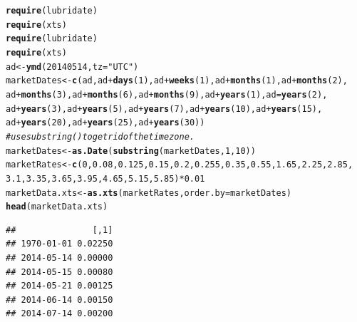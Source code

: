 \documentclass[12pt, a4paper, oneside]{article}\usepackage[]{graphicx}\usepackage[]{color}
\makeatletter
\newcommand{\hlnum}[1]{\textcolor[rgb]{0.686,0.059,0.569}{#1}}%
\newcommand{\hlstr}[1]{\textcolor[rgb]{0.192,0.494,0.8}{#1}}%
\newcommand{\hlcom}[1]{\textcolor[rgb]{0.678,0.584,0.686}{\textit{#1}}}%
\newcommand{\hlopt}[1]{\textcolor[rgb]{0,0,0}{#1}}%
\newcommand{\hlstd}[1]{\textcolor[rgb]{0.345,0.345,0.345}{#1}}%
\newcommand{\hlkwb}[1]{\textcolor[rgb]{0.69,0.353,0.396}{#1}}%
\newcommand{\hlkwc}[1]{\textcolor[rgb]{0.333,0.667,0.333}{#1}}%
\newcommand{\hlkwd}[1]{\textcolor[rgb]{0.737,0.353,0.396}{\textbf{#1}}}%
\newenvironment{kframe}{%
 \def\at@end@of@kframe{}%
 \ifinner\ifhmode%
  \def\at@end@of@kframe{\end{minipage}}%
  \begin{minipage}{\columnwidth}%
 \fi\fi%
 \def\FrameCommand##1{\hskip\@totalleftmargin \hskip-\fboxsep
 \colorbox{shadecolor}{##1}\hskip-\fboxsep
     \hskip-\linewidth \hskip-\@totalleftmargin \hskip\columnwidth}%
 \MakeFramed {\advance\hsize-\width
   \@totalleftmargin\z@ \linewidth\hsize
   \@setminipage}}%
 {\par\unskip\endMakeFramed%
 \at@end@of@kframe}
\newenvironment{knitrout}{}{} %
\makeatother
\begin{document}
\begin{knitrout}
\color{fgcolor}\begin{kframe}
\begin{alltt}
\hlkwd{require}\hlstd{(lubridate)}
\hlkwd{require}\hlstd{(xts)}
\hlkwd{require}\hlstd{(lubridate)}
\hlkwd{require}\hlstd{(xts)}
\hlstd{ad} \hlkwb{<-} \hlkwd{ymd}\hlstd{(}\hlnum{20140514}\hlstd{,} \hlkwc{tz} \hlstd{=} \hlstr{"UTC"}\hlstd{)}
\hlstd{marketDates} \hlkwb{<-} \hlkwd{c}\hlstd{(ad, ad} \hlopt{+} \hlkwd{days}\hlstd{(}\hlnum{1}\hlstd{), ad} \hlopt{+} \hlkwd{weeks}\hlstd{(}\hlnum{1}\hlstd{), ad} \hlopt{+} \hlkwd{months}\hlstd{(}\hlnum{1}\hlstd{), ad} \hlopt{+} \hlkwd{months}\hlstd{(}\hlnum{2}\hlstd{),}
    \hlstd{ad} \hlopt{+} \hlkwd{months}\hlstd{(}\hlnum{3}\hlstd{), ad} \hlopt{+} \hlkwd{months}\hlstd{(}\hlnum{6}\hlstd{), ad} \hlopt{+} \hlkwd{months}\hlstd{(}\hlnum{9}\hlstd{), ad} \hlopt{+} \hlkwd{years}\hlstd{(}\hlnum{1}\hlstd{),} \hlkwc{ad} \hlstd{=} \hlkwd{years}\hlstd{(}\hlnum{2}\hlstd{),}
    \hlstd{ad} \hlopt{+} \hlkwd{years}\hlstd{(}\hlnum{3}\hlstd{), ad} \hlopt{+} \hlkwd{years}\hlstd{(}\hlnum{5}\hlstd{), ad} \hlopt{+} \hlkwd{years}\hlstd{(}\hlnum{7}\hlstd{), ad} \hlopt{+} \hlkwd{years}\hlstd{(}\hlnum{10}\hlstd{), ad} \hlopt{+} \hlkwd{years}\hlstd{(}\hlnum{15}\hlstd{),}
    \hlstd{ad} \hlopt{+} \hlkwd{years}\hlstd{(}\hlnum{20}\hlstd{), ad} \hlopt{+} \hlkwd{years}\hlstd{(}\hlnum{25}\hlstd{), ad} \hlopt{+} \hlkwd{years}\hlstd{(}\hlnum{30}\hlstd{))}
\hlcom{# use substring() to get rid of the time zone.}
\hlstd{marketDates} \hlkwb{<-} \hlkwd{as.Date}\hlstd{(}\hlkwd{substring}\hlstd{(marketDates,} \hlnum{1}\hlstd{,} \hlnum{10}\hlstd{))}
\hlstd{marketRates} \hlkwb{<-} \hlkwd{c}\hlstd{(}\hlnum{0}\hlstd{,} \hlnum{0.08}\hlstd{,} \hlnum{0.125}\hlstd{,} \hlnum{0.15}\hlstd{,} \hlnum{0.2}\hlstd{,} \hlnum{0.255}\hlstd{,} \hlnum{0.35}\hlstd{,} \hlnum{0.55}\hlstd{,} \hlnum{1.65}\hlstd{,} \hlnum{2.25}\hlstd{,} \hlnum{2.85}\hlstd{,}
    \hlnum{3.1}\hlstd{,} \hlnum{3.35}\hlstd{,} \hlnum{3.65}\hlstd{,} \hlnum{3.95}\hlstd{,} \hlnum{4.65}\hlstd{,} \hlnum{5.15}\hlstd{,} \hlnum{5.85}\hlstd{)} \hlopt{*} \hlnum{0.01}
\hlstd{marketData.xts} \hlkwb{<-} \hlkwd{as.xts}\hlstd{(marketRates,} \hlkwc{order.by} \hlstd{= marketDates)}
\hlkwd{head}\hlstd{(marketData.xts)}
\end{alltt}
\begin{verbatim}
##               [,1]
## 1970-01-01 0.02250
## 2014-05-14 0.00000
## 2014-05-15 0.00080
## 2014-05-21 0.00125
## 2014-06-14 0.00150
## 2014-07-14 0.00200
\end{verbatim}
\end{kframe}
\end{knitrout}
\end{document}
